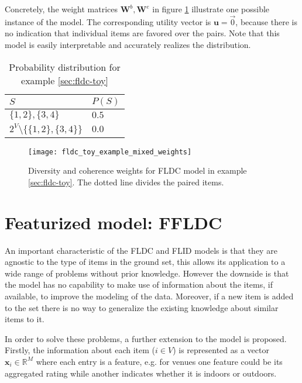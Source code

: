 Concretely, the weight matrices $\mathbf{W}^{b}, \mathbf{W}^{e}$ in figure \ref{fig:fldc-toy-mixed-weights} illustrate one possible instance of the model. The corresponding utility vector is $\mathbf{u} = \overrightarrow{0}$, because there is no indication that individual items are favored over the pairs. Note that this model is easily interpretable and accurately realizes the distribution.

\begin{table}
  \centering
  \caption{Probability distribution for example \ref{sec:fldc-toy}}
  \begin{tabular}{@{}ll@{}}
    \toprule
    $S$ & $P(S)$  \\
    \midrule
    $\{1,2\}, \{3,4\}$ & $0.5$ \\
    $2^V \setminus \{\{1,2\}, \{3,4\}\}$ & $0.0$ \\
    \bottomrule
  \end{tabular}
  \label{tab:fldc-toy-probs}
\end{table}

\begin{figure}
  \centering
  \texttt{[image: fldc\_toy\_example\_mixed\_weights]}
  \caption{Diversity and coherence weights for FLDC model in example \ref{sec:fldc-toy}. The dotted line divides the paired items.}
  \label{fig:fldc-toy-mixed-weights}
\end{figure}

\section{Featurized model: FFLDC}

An important characteristic of the FLDC and FLID models is that they are agnostic to the type of items in the ground set, this allows its application to a wide range of problems without prior knowledge. However the downside is that the model has no capability to make use of information about the items, if available, to improve the modeling of the data. Moreover, if a new item is added to the set there is no way to generalize the existing knowledge about similar items to it.

In order to solve these problems, a further extension to the model is proposed. Firstly, the information about each item ($i \in V$) is represented as a vector $\mathbf{x}_{i} \in \mathbb{R}^{M}$ where each entry is a feature, e.g. for venues one feature could be its aggregated rating while another indicates whether it is indoors or outdoors.

